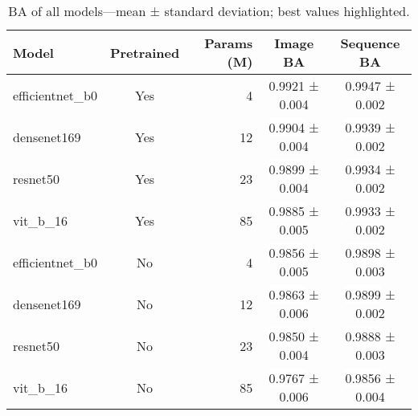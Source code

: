 \begin{table}[ht]
\centering
\caption{\acs{BA} of all models---mean ± standard deviation; best values highlighted.}
\label{tab:bal_acc_by_model}
\begin{tabular}{l c r c c}
\toprule
Model & Pretrained & Params (M) & Image \acs{BA} & Sequence \acs{BA} \\
\midrule
efficientnet\_b0 & Yes & 4 & \colorbox{gray!20}{0.9921} ± 0.004 & \colorbox{gray!20}{0.9947} ± 0.002 \\
densenet169 & Yes & 12 & \colorbox{white}{0.9904} ± 0.004 & \colorbox{white}{0.9939} ± 0.002 \\
resnet50 & Yes & 23 & \colorbox{white}{0.9899} ± 0.004 & \colorbox{white}{0.9934} ± 0.002 \\
vit\_b\_16 & Yes & 85 & \colorbox{white}{0.9885} ± 0.005 & \colorbox{white}{0.9933} ± 0.002 \\
\midrule
efficientnet\_b0 & No & 4 & \colorbox{white}{0.9856} ± 0.005 & \colorbox{white}{0.9898} ± 0.003 \\
densenet169 & No & 12 & \colorbox{white}{0.9863} ± 0.006 & \colorbox{white}{0.9899} ± 0.002 \\
resnet50 & No & 23 & \colorbox{white}{0.9850} ± 0.004 & \colorbox{white}{0.9888} ± 0.003 \\
vit\_b\_16 & No & 85 & \colorbox{white}{0.9767} ± 0.006 & \colorbox{white}{0.9856} ± 0.004 \\
\bottomrule
\end{tabular}
\end{table}
